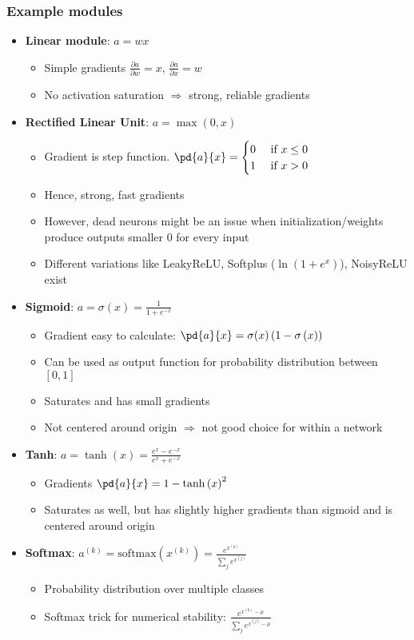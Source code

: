 \subsubsection{Example modules}
\begin{itemize}
	\item \textbf{Linear module}: $a = wx$
	\begin{itemize}
		\item Simple gradients $\frac{\partial a}{\partial w} = x$, $\frac{\partial a}{\partial x} = w$
		\item No activation saturation $\Rightarrow$ strong, reliable gradients
	\end{itemize}
	\item \textbf{Rectified Linear Unit}: $a = \max(0,x)$
	\begin{itemize}
		\item Gradient is step function. $\pd{a}{x} = \begin{cases}
		0 & \text{ if } x\leq 0\\
		1 & \text{ if } x > 0\\
		\end{cases}$
		\item Hence, strong, fast gradients
		\item However, dead neurons might be an issue when initialization/weights produce outputs smaller 0 for every input 
		\item Different variations like LeakyReLU, Softplus ($\ln(1+e^{x})$), NoisyReLU exist
	\end{itemize}
	\item \textbf{Sigmoid}: $a=\sigma(x)=\frac{1}{1+e^{-x}}$
	\begin{itemize}
		\item Gradient easy to calculate: $\pd{a}{x} = \sigma(x)\left(1-\sigma\left(x\right)\right)$
		\item Can be used as output function for probability distribution between $[0,1]$
		\item Saturates and has small gradients
		\item Not centered around origin $\Rightarrow$ not good choice for within a network
	\end{itemize}
	\item \textbf{Tanh}: $a=\tanh\left(x\right)=\frac{e^{x}-e^{-x}}{e^{x}+e^{-x}}$
	\begin{itemize}
		\item Gradients $\pd{a}{x}=1-\tanh\left(x\right)^2$
		\item Saturates as well, but has slightly higher gradients than sigmoid and is centered around origin
	\end{itemize}
	\item \textbf{Softmax}: $a^{(k)} = \text{softmax}\left(x^{(k)}\right) = \frac{e^{x^{(k)}}}{\sum_j e^{x^{(j)}}}$
	\begin{itemize}
		\item Probability distribution over multiple classes
		\item Softmax trick for numerical stability: $\frac{e^{x^{(k)}-\mu}}{\sum_j e^{x^{(j)}-\mu}}$
	\end{itemize}
\end{itemize}
